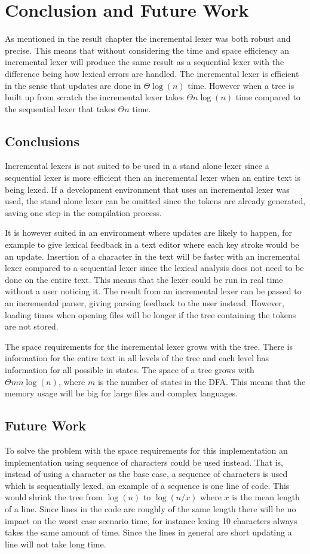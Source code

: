 \chapter{Conclusion and Future Work \label{chap:concfuture}}
As mentioned in the result chapter the incremental lexer was both robust and
precise. This means that without considering the time and space efficiency an
incremental lexer will produce the same result as a sequential lexer with the
difference being how lexical errors are handled. The incremental lexer is
efficient in the sense that updates are done in $\Theta \log(n)$ time. However
when a tree is built up from scratch the incremental lexer takes
$\Theta n\log(n)$ time compared to the sequential lexer that takes $\Theta n$
time.

\section{Conclusions}
Incremental lexers is not suited to be used in a stand alone lexer since a
sequential lexer is more efficient then an incremental lexer when an entire text
is being lexed. If a development environment that uses an incremental lexer was
used, the stand alone lexer can be omitted since the tokens are already
generated, saving one step in the compilation process.

It is however suited in an environment where updates are likely to happen, for
example to give lexical feedback in a text editor where each key stroke would be
an update. Insertion of a character in the text will be faster with an
incremental lexer compared to a sequential lexer since the lexical analysis does
not need to be done on the entire text. This means that the lexer could be run
in real time without a user noticing it. The result from an incremental lexer
can be passed to an incremental parser, giving parsing feedback to the user
instead. However, loading times when opening files will be longer if the tree
containing the tokens are not stored.

The space requirements for the incremental lexer grows with the tree. There is
information for the entire text in all levels of the tree and each level has
information for all possible in states. The space of a tree grows with
$\Theta mn\log(n)$, where $m$ is the number of states in the DFA. This means
that the memory usage will be big for large files and complex languages.

\section{Future Work}
To solve the problem with the space requirements for this implementation an
implementation using sequence of characters could be used instead. That is,
instead of using a character as the base case, a sequence of characters is used
which is sequentially lexed, an example of a sequence is one line of code. This
would shrink the tree from $\log(n)$ to $\log(n/x)$ where $x$ is the mean length
of a line. Since lines in the code are roughly of the same length there will be
no impact on the worst case scenario time, for instance lexing 10 characters
always takes the same amount of time. Since the lines in general are short
updating a line will not take long time.

